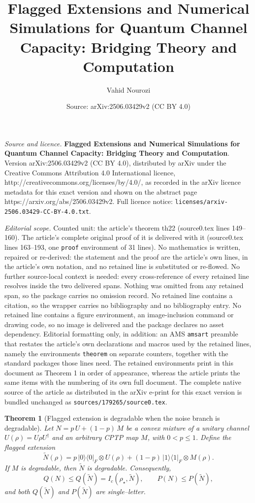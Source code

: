 \documentclass[10pt,a4paper]{amsart}
\title{\textbf{Flagged Extensions and Numerical Simulations for Quantum Channel Capacity: Bridging Theory and Computation}}
\author{Vahid Nourozi}
\date{Source: arXiv:2506.03429v2 (CC BY 4.0)}
\newtheorem{theorem}{Theorem}
\begin{document}
\maketitle

\noindent\emph{Source and licence.} \textbf{Flagged Extensions and Numerical Simulations for Quantum Channel Capacity: Bridging Theory and Computation}. Version arXiv:2506.03429v2 (CC BY 4.0), distributed by arXiv under the Creative Commons Attribution 4.0 International licence, http://creativecommons.org/licenses/by/4.0/, as recorded in the arXiv licence metadata for this exact version and shown on the abstract page https://arxiv.org/abs/2506.03429v2. Full licence notice: \texttt{licenses/arxiv-2506.03429-CC-BY-4.0.txt}.\par\smallskip

\noindent\textit{Editorial scope.} Counted unit: the article's theorem th22 (source0.tex lines 149--160). The article's complete original proof of it is delivered with it (source0.tex lines 163--193, one \texttt{proof} environment of 31 lines). No mathematics is written, repaired or re-derived: the statement and the proof are the article's own lines, in the article's own notation, and no retained line is substituted or re-flowed.  No further source-local context is needed: every cross-reference of every retained line resolves inside the two delivered spans.  Nothing was omitted from any retained span, so the package carries no omission record.  No retained line contains a citation, so the wrapper carries no bibliography and no bibliography entry.  No retained line contains a figure environment, an image-inclusion command or drawing code, so no image is delivered and the package declares no asset dependency.  Editorial formatting only, in addition: an AMS \texttt{amsart} preamble that restates the article's own declarations and macros used by the retained lines, namely the environments \texttt{theorem} on separate counters, together with the standard packages those lines need.  The retained environments print in this document as Theorem 1 in order of appearance, whereas the article prints the same items with the numbering of its own full document.  The complete native source of the article as distributed in the arXiv e-print for this exact version is bundled unchanged as \texttt{sources/179265/source0.tex}.
\begin{theorem}[Flagged extension is degradable when the noise branch is degradable]\label{th22}
Let $N = p\,U + (1-p)\,M$ be a convex mixture of a unitary channel $U(\rho)=U\rho U^\dagger$ and an arbitrary CPTP map $M$, with $0<p\le 1$. Define the flagged extension
\[
\widetilde N(\rho)= p\,|0\rangle\!\langle 0|_F\otimes U(\rho) + (1-p)\,|1\rangle\!\langle 1|_F\otimes M(\rho).
\]
If $M$ is degradable, then $\widetilde N$ is degradable. Consequently,
\[
Q(N)\le Q(\widetilde N)= I_c(\rho_\star,\widetilde N),\qquad 
P(N)\le P(\widetilde N),
\]
and both $Q(\widetilde N)$ and $P(\widetilde N)$ are single–letter.
\end{theorem}
\end{document}
